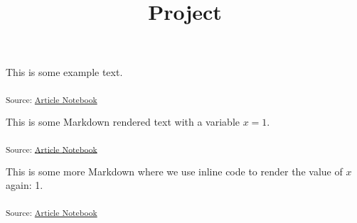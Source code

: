 \documentclass[
  letterpaper,
  DIV=11,
  numbers=noendperiod]{scrreprt}
\title{Project}
\author{}
\date{}
\begin{document}
\maketitle


This is some example text.

\textsubscript{Source:
\href{https://jacopok.github.io/quarto-template/index.qmd.html}{Article
Notebook}}

This is some Markdown rendered text with a variable \(x=1\).

\textsubscript{Source:
\href{https://jacopok.github.io/quarto-template/index.qmd.html}{Article
Notebook}}

This is some more Markdown where we use inline code to render the value
of \(x\) again: 1.

\textsubscript{Source:
\href{https://jacopok.github.io/quarto-template/index.qmd.html}{Article
Notebook}}
\end{document}
